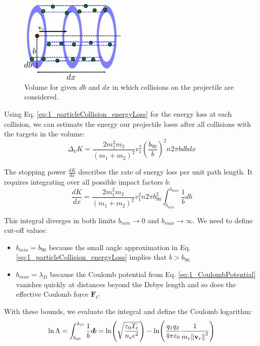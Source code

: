 \begin{figure}[H]
	\centering
	\includegraphics[width=0.45\textwidth]{schemes/collision_crossSection.png}
	\caption{Volume for given \( d\!b \) and \( d\!x \) in which collisions on the projectile are considered.}
	\label{fig:TokamakBasics_collisionCrossSection}
\end{figure}

Using Eq. \ref{eq:1_particleCollision_energyLoss} for the energy loss at each collision, we can estimate the energy our projectile loses after all collisions with the targets in the volume:
\begin{equation}
	\Delta_V K = \frac{2m_1^2m_2}{(m_1 + m_2)^2} v_1^2 \left(\frac{b_{90}}{b}\right)^2 n 2\pi b d\!b d\!x
\end{equation}

The stopping power $\frac{dK}{dx}$ describes the rate of energy loss per unit path length. It requires integrating over all possible impact factors \( b \):
\begin{equation}
	\label{eq:1_stoppingPower}
	\frac{dK}{dx} = \frac{2m_1^2m_2}{(m_1 + m_2)^2} v_1^2 n 2\pi b_{90}^2 \int_{b_{min}}^{b_{max}} \frac{1}{b} d\!b
\end{equation}

This integral diverges in both limits \( b_{min} \to 0 \) and \( b_{max} \to \infty \). We need to define cut-off values:

\begin{itemize}
	\item $b_{min} = b_{90}$ because the small angle approximation in Eq. \ref{eq:1_particleCollision_energyLoss} implies that $b>b_{90}$ \\
	\item $b_{max} = \lambda_D$ because the Coulomb potential from Eq. \ref{eq:1_CoulombPotential} vanishes quickly at distances beyond the Debye length and so does the effective Coulomb force $\mathbf{F}_C$
\end{itemize}

With these bounds, we evaluate the integral and define the Coulomb logarithm:
\begin{equation}
	\label{eq:1_CoulombLogarithm}
	\ln\Lambda = \int_{b_{90}}^{\lambda_D} \frac{1}{b} d\!b = \ln(\sqrt{\frac{\varepsilon_0T_e}{n_ee^2}}) - \ln(\frac{q_1q_2}{4\pi\varepsilon_0}\frac{1}{m_r\norm{\mathbf{v}_r}^2})
\end{equation}

